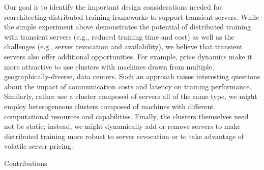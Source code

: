 Our goal is to identify the important design considerations needed for
rearchitecting distributed training frameworks to support transient servers.
While the simple experiment above demonstrates the potential of distributed
training with transient servers (e.g., reduced training time and cost) as well
as the challenges (e.g., server revocation and availability), we believe that
transient servers also offer additional opportunities.  For example, price
dynamics make it more attractive to use clusters with machines drawn from
multiple, geographically-diverse, data centers. Such an approach raises
interesting questions about the impact of communication costs and latency on
training performance. Similarly, rather use a cluster composed of servers all
of the same type,  we might employ heterogeneous clusters composed of machines
with different computational resources and capabilities. Finally, the clusters
themselves need not be static; instead, we might dynamically add or remove
servers to make distributed training more robust to server revocation or to
take advantage of volatile server pricing.   
 

Contributions.
